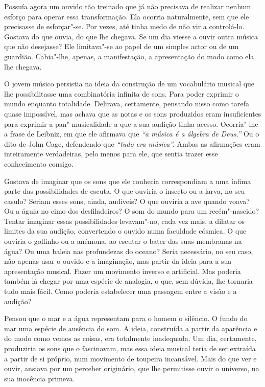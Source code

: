 Possuía agora um ouvido tão treinado que já não precisava de realizar
nenhum esforço para operar essa transformação. Ela ocorria naturalmente,
sem que ele precisasse de esforçar"-se. Por vezes, até tinha medo de não
vir a controlá-lo. Gostava do que ouvia, do que lhe chegava. Se um dia
viesse a ouvir outra música que não desejasse? Ele limitava"-se ao papel
de um simples actor ou de um guardião. Cabia"-lhe, apenas, a
manifestação, a apresentação do modo como ela lhe chegava.

O jovem músico persistia na ideia da construção de um vocabulário
musical que lhe possibilitasse uma combinatória infinita de sons. Para
poder exprimir o mundo enquanto totalidade. Delirava, certamente,
pensando nisso como tarefa quase impossível, mas achava que as notas e
os sons produzidos eram insuficientes para exprimir a pan"-musicalidade a
que a sua audição tinha acesso. Ocorria"-lhe a frase de Leibniz, em que
ele afirmava que \emph{``a música é a álgebra de Deus.''} Ou o dito de
John Cage, defendendo que \emph{``tudo era música''.} Ambas as
afirmações eram inteiramente verdadeiras, pelo menos para ele, que
sentia trazer esse conhecimento consigo.

Gostava de imaginar que os sons que ele conhecia correspondiam a uma
ínfima parte das possibilidades de escuta. O que ouviria o insecto ou a
larva, no seu casulo? Seriam esses sons, ainda, audíveis? O que ouviria
a ave quando voava? Ou a águia no cimo dos desfiladeiros? O som do mundo
para um recém"-nascido? Tentar imaginar essas possibilidades levavam"-no,
cada vez mais, a dilatar os limites da sua audição, convertendo o ouvido
numa faculdade cósmica. O que ouviria o golfinho ou a anémona, ao
escutar o bater das suas membranas na água? Ou uma baleia nas
profundezas do oceano? Seria necessário, no seu caso, não apenas usar o
ouvido e a imaginação, mas partir da ideia para a sua apresentação
musical. Fazer um movimento inverso e artificial. Mas poderia também lá
chegar por uma espécie de analogia, o que, sem dúvida, lhe tornaria tudo
mais fácil. Como poderia estabelecer uma passagem entre a visão e a
audição?

Pensou que o mar e a água representam para o homem o silêncio. O fundo
do mar uma espécie de ausência do som. A ideia, construída a partir da
aparência e do modo como vemos as coisas, era totalmente inadequada. Um
dia, certamente, produziria os sons que o fascinavam, mas essa ideia
musical teria de ser extraída a partir de si próprio, num movimento de
toupeira incansável. Mais do que ver e ouvir, ansiava por um perceber
originário, que lhe permitisse ouvir o universo, na sua inocência
primeva.

